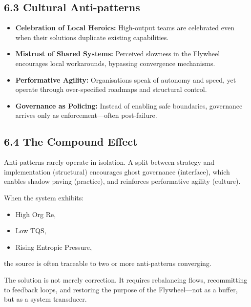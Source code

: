 \documentclass[12pt]{article}
\begin{document}
\subsection*{6.3 Cultural Anti-patterns}

\begin{antipatternbox}
\begin{itemize}
    \item \textbf{Celebration of Local Heroics:} High-output teams are celebrated even when their solutions duplicate existing capabilities.
    
    \item \textbf{Mistrust of Shared Systems:} Perceived slowness in the Flywheel encourages local workarounds, bypassing convergence mechanisms.
    
    \item \textbf{Performative Agility:} Organisations speak of autonomy and speed, yet operate through over-specified roadmaps and structural control.
    
    \item \textbf{Governance as Policing:} Instead of enabling safe boundaries, governance arrives only as enforcement---often post-failure.
\end{itemize}
\end{antipatternbox}

\subsection*{6.4 The Compound Effect}

\begin{antipatternbox}
Anti-patterns rarely operate in isolation. A split between strategy and implementation (structural) encourages ghost governance (interface), which enables shadow paving (practice), and reinforces performative agility (culture).

When the system exhibits:
\begin{itemize}
    \item High Org Re,
    \item Low TQS,
    \item Rising Entropic Pressure,
\end{itemize}
the source is often traceable to two or more anti-patterns converging.

The solution is not merely correction. It requires rebalancing flows, recommitting to feedback loops, and restoring the purpose of the Flywheel---not as a buffer, but as a system transducer.
\end{antipatternbox}
\end{document}
